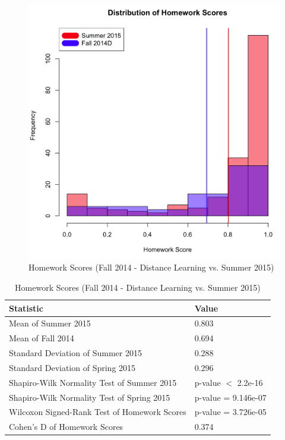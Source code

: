 \begin{figure}
	\centering
	\includegraphics[width=5in]{img/chapter4/hw_su15_vs_f14d}
	\caption[Homework Scores (Fall 2014 - Distance Learning vs. Summer 2015)]{Homework Scores (Fall 2014 - Distance Learning vs. Summer 2015)}
  \label{fig:hwf14dSu15}
\end{figure}

\begin{small}
\begin{table}
  \centering
  \begin{tabular}{|l|l|}
    \hline
    \textbf{Statistic} & \textbf{Value} \\
	\hline
	Mean of Summer 2015 & 0.803 \\
	\hline
	Mean of Fall 2014 & 0.694 \\
	\hline
	Standard Deviation of Summer 2015 & 0.288 \\
	\hline
	Standard Deviation of Spring 2015 & 0.296 \\
	\hline
	Shapiro-Wilk Normality Test of Summer 2015 & p-value $<$ 2.2e-16 \\
	\hline
	Shapiro-Wilk Normality Test of Spring 2015 & p-value = 9.146e-07 \\
	\hline
	Wilcoxon Signed-Rank Test of Homework Scores & p-value = 3.726e-05 \\
	\hline
	Cohen's D of Homework Scores & 0.374 \\
	\hline
  \end{tabular}
	\caption[Homework Scores (Fall 2014 - Distance Learning vs. Summer 2015)]{Homework Scores (Fall 2014 - Distance Learning vs. Summer 2015)}
  \label{tab:hwf14dSu15}
\end{table}
\end{small}

